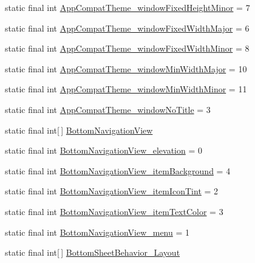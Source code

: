 \begin{CompactItemize}
\item 
static final int \hyperlink{classandroid_1_1support_1_1v4_1_1_r_1_1styleable_b7b787b3482486bcf6134e26f3f79737}{AppCompatTheme\_\-windowFixedHeightMinor} = 7
\item 
static final int \hyperlink{classandroid_1_1support_1_1v4_1_1_r_1_1styleable_307ec462d988be66e4bf9bd5ef416bc4}{AppCompatTheme\_\-windowFixedWidthMajor} = 6
\item 
static final int \hyperlink{classandroid_1_1support_1_1v4_1_1_r_1_1styleable_0de992b88b66a205f256dcedf020c78e}{AppCompatTheme\_\-windowFixedWidthMinor} = 8
\item 
static final int \hyperlink{classandroid_1_1support_1_1v4_1_1_r_1_1styleable_73b62d7534ce501813e6dcf984016df4}{AppCompatTheme\_\-windowMinWidthMajor} = 10
\item 
static final int \hyperlink{classandroid_1_1support_1_1v4_1_1_r_1_1styleable_43bc5686bdcae44e39f9c6bac931d7ea}{AppCompatTheme\_\-windowMinWidthMinor} = 11
\item 
static final int \hyperlink{classandroid_1_1support_1_1v4_1_1_r_1_1styleable_8b1c22084adcad0c0271c952798a1a61}{AppCompatTheme\_\-windowNoTitle} = 3
\item 
static final int\mbox{[}$\,$\mbox{]} \hyperlink{classandroid_1_1support_1_1v4_1_1_r_1_1styleable_731fa193e6e8634aff724fecf9d4f640}{BottomNavigationView}
\item 
static final int \hyperlink{classandroid_1_1support_1_1v4_1_1_r_1_1styleable_fa96e594c72f2eba30a1c5154a95b87e}{BottomNavigationView\_\-elevation} = 0
\item 
static final int \hyperlink{classandroid_1_1support_1_1v4_1_1_r_1_1styleable_330b02e19c11aae9367f4261f0e3d83e}{BottomNavigationView\_\-itemBackground} = 4
\item 
static final int \hyperlink{classandroid_1_1support_1_1v4_1_1_r_1_1styleable_79d29538f6e5b9f23314f6cfa696688f}{BottomNavigationView\_\-itemIconTint} = 2
\item 
static final int \hyperlink{classandroid_1_1support_1_1v4_1_1_r_1_1styleable_587ccbdac026a0e313be585abff19ab0}{BottomNavigationView\_\-itemTextColor} = 3
\item 
static final int \hyperlink{classandroid_1_1support_1_1v4_1_1_r_1_1styleable_b466b14ca9f60097882bb309cd4e7d6f}{BottomNavigationView\_\-menu} = 1
\item 
static final int\mbox{[}$\,$\mbox{]} \hyperlink{classandroid_1_1support_1_1v4_1_1_r_1_1styleable_d67360f84d04f5db038977a30714370e}{BottomSheetBehavior\_\-Layout}

\end{CompactItemize}
